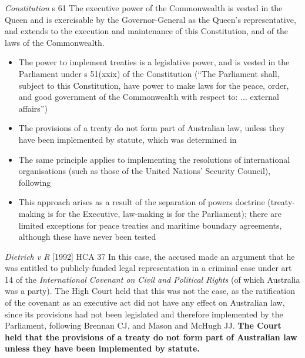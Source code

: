 \begin{statutedetails}{\textit{Constitution} s 61}
    \flushleft
    The executive power of the Commonwealth is vested in the Queen and is exercisable by the Governor-General as the Queen's representative, and extends to the execution and maintenance of this Constitution, and of the laws of the Commonwealth.
\end{statutedetails}

\begin{itemize}
    \item The power to implement treaties is a legislative power, and is vested in the Parliament under s 51(xxix) of the Constitution (``The Parliament shall, subject to this Constitution, have power to make laws for the peace, order, and good government of the Commonwealth with respect to: ... external affairs'')
    \item The provisions of a treaty do not form part of Australian law, unless they have been implemented by statute, which was determined in 
    \item The same principle applies to implementing the resolutions of international organisations (such as those of the United Nations' Security Council), following 
    \item This approach arises as a result of the separation of powers doctrine (treaty-making is for the Executive, law-making is for the Parliament); there are limited exceptions for peace treaties and maritime boundary agreements, although these have never been tested
\end{itemize}

\begin{casedetails}{\textit{Dietrich v R} [1992] HCA 37}
    \flushleft
    In this case, the accused made an argument that he was entitled to publicly-funded legal representation in a criminal case under art 14 of the \textit{International Covenant on Civil and Political Rights} (of which Australia was a party). The High Court held that this was not the case, as the ratification of the covenant as an executive act did not have any effect on Australian law, since its provisions had not been legislated and therefore implemented by the Parliament, following Brennan CJ, and Mason and McHugh JJ. \textbf{The Court held that the provisions of a treaty do not form part of Australian law unless they have been implemented by statute.}
\end{casedetails}

